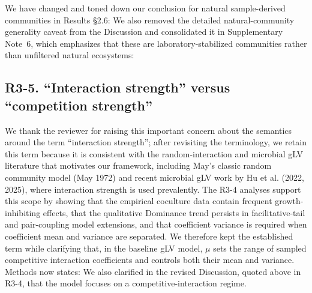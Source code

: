 \responselabel
We have changed and toned down our conclusion for natural sample-derived communities in Results \S2.6:  We also removed the detailed natural-community generality caveat from the Discussion and consolidated it in Supplementary Note~6, which emphasizes that these are laboratory-stabilized communities rather than unfiltered natural ecosystems: 

\subsection*{R3-5. ``Interaction strength'' versus ``competition strength''}


\responselabel
We thank the reviewer for raising this important concern about the semantics around the term ``interaction strength''; after revisiting the terminology, we retain this term because it is consistent with the random-interaction and microbial gLV literature that motivates our framework, including May's classic random community model (May 1972) and recent microbial gLV work by Hu et al. (2022, 2025), where interaction strength is used prevalently. The R3-4 analyses support this scope by showing that the empirical coculture data contain frequent growth-inhibiting effects, that the qualitative Dominance trend persists in facilitative-tail and pair-coupling model extensions, and that coefficient variance is required when coefficient mean and variance are separated. We therefore kept the established term while clarifying that, in the baseline gLV model, $\mu$ sets the range of sampled competitive interaction coefficients and controls both their mean and variance. Methods now states:  We also clarified in the revised Discussion, quoted above in R3-4, that the model focuses on a competitive-interaction regime.
